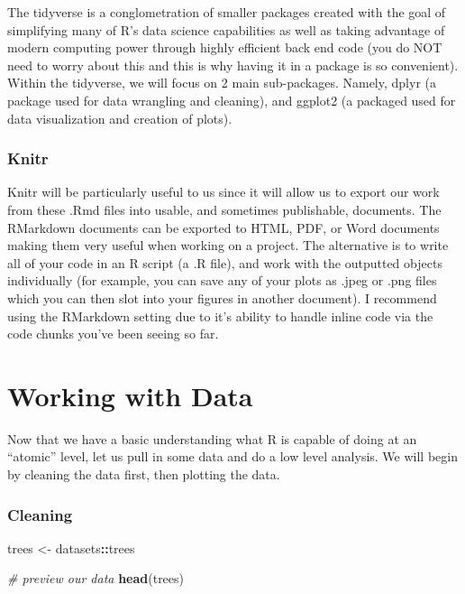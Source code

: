 \documentclass[]{article}
\newenvironment{Shaded}{\begin{snugshade}}{\end{snugshade}}
\newcommand{\CommentTok}[1]{\textcolor[rgb]{0.56,0.35,0.01}{\textit{#1}}}
\newcommand{\KeywordTok}[1]{\textcolor[rgb]{0.13,0.29,0.53}{\textbf{#1}}}
\newcommand{\NormalTok}[1]{#1}
\newcommand{\OperatorTok}[1]{\textcolor[rgb]{0.81,0.36,0.00}{\textbf{#1}}}
\newcommand{\StringTok}[1]{\textcolor[rgb]{0.31,0.60,0.02}{#1}}
\begin{document}
The tidyverse is a conglometration of smaller packages created with the
goal of simplifying many of R's data science capabilities as well as
taking advantage of modern computing power through highly efficient back
end code (you do NOT need to worry about this and this is why having it
in a package is so convenient). Within the tidyverse, we will focus on 2
main sub-packages. Namely, dplyr (a package used for data wrangling and
cleaning), and ggplot2 (a packaged used for data visualization and
creation of plots).

\hypertarget{knitr}{%
\subsubsection{Knitr}\label{knitr}}

Knitr will be particularly useful to us since it will allow us to export
our work from these .Rmd files into usable, and sometimes publishable,
documents. The RMarkdown documents can be exported to HTML, PDF, or Word
documents making them very useful when working on a project. The
alternative is to write all of your code in an R script (a .R file), and
work with the outputted objects individually (for example, you can save
any of your plots as .jpeg or .png files which you can then slot into
your figures in another document). I recommend using the RMarkdown
setting due to it's ability to handle inline code via the code chunks
you've been seeing so far.

\hypertarget{working-with-data}{%
\section{Working with Data}\label{working-with-data}}

Now that we have a basic understanding what R is capable of doing at an
``atomic'' level, let us pull in some data and do a low level analysis.
We will begin by cleaning the data first, then plotting the data.

\hypertarget{cleaning}{%
\subsubsection{Cleaning}\label{cleaning}}

\begin{Shaded}
\begin{Highlighting}[]
\NormalTok{trees <-}\StringTok{ }\NormalTok{datasets}\OperatorTok{::}\NormalTok{trees}

\CommentTok{# preview our data}
\KeywordTok{head}\NormalTok{(trees)}
\end{Highlighting}
\end{Shaded}
\end{document}
